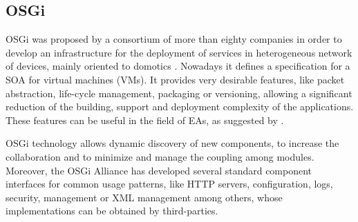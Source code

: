 \subsection{OSGi}
\label{subsec:soa:osgi}
OSGi was proposed by a consortium of more than
eighty companies in order to develop an infrastructure for the
deployment of services in heterogeneous network of devices, mainly
oriented to domotics \cite{GarciaSanchez2013Gateway}. Nowadays it defines a
specification for a SOA for virtual
machines (VMs). It provides very desirable features, like
packet abstraction, life-cycle management, packaging or versioning, %
allowing a significant reduction of the building, support and deployment
complexity of the applications. These features can be useful in the field of EAs, as suggested by  \cite{WagnerPlugins07}.

OSGi technology allows dynamic discovery of new components, to increase the collaboration and to minimize and manage the coupling
among modules. Moreover, the
OSGi Alliance has developed several standard component interfaces for
common usage patterns, like HTTP servers, configuration, logs, security,
management or XML management among others, whose implementations can
be obtained by third-parties. %

